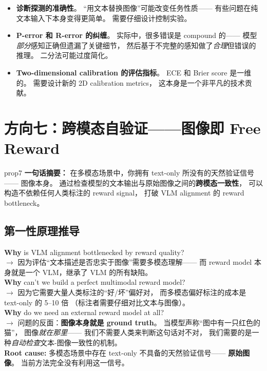 \documentclass[12pt,a4paper]{article}
\begin{document}
\begin{riskbox}
\begin{itemize}[leftmargin=1.5em]
  \item \textbf{诊断探测的准确性}。
    ``用文本替换图像''可能改变任务性质——
    有些问题在纯文本输入下本身变得更简单。
    需要仔细设计控制实验。
  \item \textbf{P-error 和 R-error 的纠缠}。
    实际中，很多错误是 compound 的——
    模型\textit{部分}感知正确但遗漏了关键细节，
    然后基于不完整的感知做了\textit{合理}但错误的推理。
    二分法可能过度简化。
  \item \textbf{Two-dimensional calibration 的评估指标}。
    ECE 和 Brier score 是一维的。
    需要设计新的 2D calibration metrics，
    这本身是一个非平凡的技术贡献。
\end{itemize}
\end{riskbox}


\newpage
\section{方向七：跨模态自验证——图像即 Free Reward}
\label{sec:prop7}

\begin{proposalbox}{prop7}
\textbf{一句话摘要：}
在多模态场景中，你拥有 text-only 所没有的天然验证信号——
图像本身。
通过检查模型的文本输出与原始图像之间的\textbf{跨模态一致性}，
可以构造不依赖任何人类标注的 reward signal，
打破 VLM alignment 的 reward bottleneck。
\end{proposalbox}

\subsection{第一性原理推导}

\begin{whybox}
\textbf{Why} is VLM alignment bottlenecked by reward quality?\\
$\rightarrow$ 因为评估``文本描述是否忠实于图像''需要多模态理解——
而 reward model 本身就是一个 VLM，继承了 VLM 的所有缺陷。\\[3pt]
\textbf{Why} can't we build a perfect multimodal reward model?\\
$\rightarrow$ 因为它需要大量人类标注的``好/坏''偏好对，
而多模态偏好标注的成本是 text-only 的 5--10 倍
（标注者需要仔细对比文本与图像）。\\[3pt]
\textbf{Why} do we need an external reward model at all?\\
$\rightarrow$ 问题的反面：\textbf{图像本身就是 ground truth}。
当模型声称``图中有一只红色的猫''，
图像\textit{就在那里}——
我们不需要人类来判断这句话对不对，
我们需要的是一种\textit{自动检查}文本-图像一致性的机制。\\[3pt]
\textbf{Root cause:}
多模态场景中存在 text-only 不具备的天然验证信号——
\textbf{原始图像}。
当前方法完全没有利用这一信号。
\end{whybox}
\end{document}
